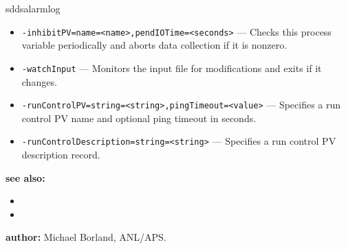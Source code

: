 \begin{sddsprog}{sddsalarmlog}
\begin{itemize}
  \item {\tt -inhibitPV=name=<name>,pendIOTime=<seconds>} --- Checks this process variable periodically and aborts data collection if it is nonzero.
  \item {\tt -watchInput} --- Monitors the input file for modifications and exits if it changes.
  \item {\tt -runControlPV=string=<string>,pingTimeout=<value>} --- Specifies a run control PV name and optional ping timeout in seconds.
  \item {\tt -runControlDescription=string=<string>} --- Specifies a run control PV description record.
\end{itemize}

\item \textbf{see also:}
\begin{itemize}
  \item {}
  \item {}
\end{itemize}


\item \textbf{author:} Michael Borland, ANL/APS.
\end{sddsprog}
